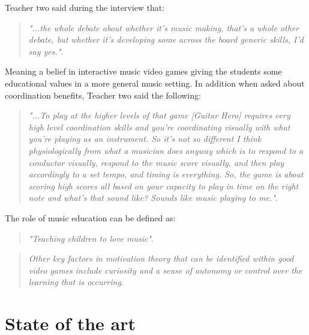 	Teacher two said during the interview that:
	\begin{quote}
		\textit{"...the whole debate about whether it’s music making, that’s a whole other debate, but whether it’s developing some across the board generic skills, I’d say yes."}\cite[p.~98]{interactiveMusicVideoGames}.\\
	\end{quote}
	Meaning a belief in interactive music video games giving the students some educational values in a more general music setting. In addition when asked about coordination benefits, Teacher two said the following:
	\begin{quote}
		\textit{"...To play at the higher levels of that game [Guitar Hero] requires very high level coordination skills and you’re coordinating visually with what you’re playing as an instrument. So it’s not so different I think physiologically from what a musician does anyway which is to respond to a conductor visually, respond to the music score visually, and then play accordingly to a set tempo, and timing is everything. So, the game is about scoring high scores all based on your capacity to play in time on the right note and what’s that sound like? Sounds like music playing to me."}\cite[p.~98]{interactiveMusicVideoGames}.\\
	\end{quote}

	The role of music education can be defined as:
	\begin{quote}
		\textit{"Teaching children to love music"}\cite[p.~94]{interactiveMusicVideoGames}.\\
	\end{quote}
	
	\begin{quote}
		\textit{Other key factors in motivation theory that can be identified within good video games include curiosity and a sense of autonomy or control over the learning that is occurring}\cite[p.~92]{interactiveMusicVideoGames}.\\
	\end{quote}
	
	\cite{constructivism}

\section{State of the art}\label{sec:sota}
